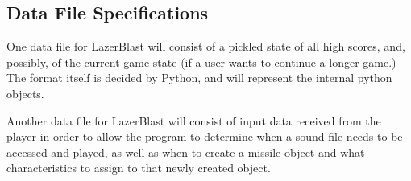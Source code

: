     \inputminted{python}{../assets/ships.py}

    \inputminted{python}{../assets/menus.py}

    \inputminted{python}{../assets/sounds_and_projectiles.py}

\subsection*{Data File Specifications}
    One data file for LazerBlast will consist of a
    pickled state of all high scores, and, possibly,
    of the current game state (if a user wants to
    continue a longer game.)  The format itself is
    decided by Python, and will represent the internal
    python objects.

    Another data file for LazerBlast will consist of input data received
    from the player in order to allow the program to determine when
    a sound file needs to be accessed and played, as well as when to
    create a missile object and what characteristics to assign to
    that newly created object.

